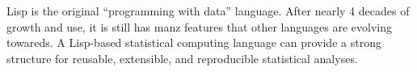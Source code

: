 







Lisp is the original ``programming with data'' language.  After nearly
4 decades of growth and use, it is still has manz features that other
languages are evolving towareds.  A Lisp-based statistical computing
language can provide a strong structure for reusable, extensible, and
reproducible statistical analyses. 






